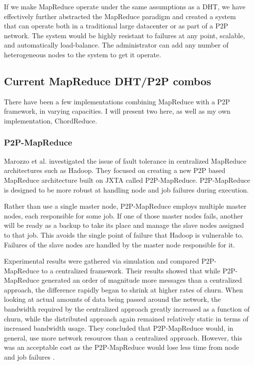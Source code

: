 \documentclass[10pt,letterpaper,twoside]{report}
\begin{document}
If we make MapReduce operate under the same assumptions as a DHT, we have effectively further abstracted the MapReduce paradigm and created a system that can operate both in a traditional large datacenter or as part of a P2P network.
The system would be highly resistant to failures at any point, scalable, and automatically load-balance. 
The administrator can add any number of heterogeneous nodes to the system to get it operate.

\subsection{Current MapReduce DHT/P2P combos}
There have been a few implementations combining MapReduce with a P2P framework, in varying capacities.  
I will present two here, as well as my own implementation, ChordReduce.

\subsubsection{P2P-MapReduce}
Marozzo et al. \cite{marozzo2012p2p} investigated the issue of fault tolerance in centralized MapReduce architectures such as Hadoop.  
They focused on creating a new P2P based MapReduce architecture built on JXTA called P2P-MapReduce.  
P2P-MapReduce is designed to be more robust at handling node and job failures during execution.

Rather than use a single master node, P2P-MapReduce employs multiple master nodes, each responsible for some job.  
If one of those master nodes fails, another will be ready as a backup to take its place and manage the slave nodes assigned to that job.  
This avoids the single point of failure that Hadoop is vulnerable to. Failures of the slave nodes are handled by the master node responsible for it.

Experimental results were gathered via simulation and compared P2P-MapReduce to a centralized framework. 
Their results showed that while P2P-MapReduce generated an order of magnitude more messages than a centralized approach, the difference rapidly began to shrink at higher rates of churn.  
When looking at actual amounts of data being passed around the network, the bandwidth required by the centralized approach greatly increased as a function of churn, while the distributed approach again remained relatively static in terms of increased bandwidth usage. 
They concluded that P2P-MapReduce would, in general, use more network resources than a centralized approach. 
However, this was an acceptable cost as the P2P-MapReduce would lose less time from node and job failures \cite{marozzo2012p2p}.
\end{document}
